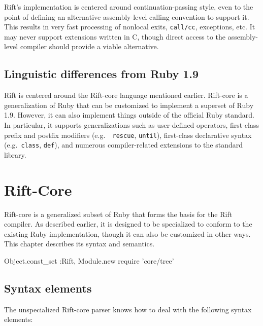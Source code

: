 \documentclass{report}
\begin{document}
    Rift's implementation is centered around continuation-passing style, even to the point of defining an alternative assembly-level calling convention to support it. This results in very fast
    processing of nonlocal exits, {\tt call/cc}, exceptions, etc. It may never support extensions written in C, though direct access to the assembly-level compiler should provide a viable
    alternative.

\section{Linguistic differences from Ruby 1.9}
    Rift is centered around the Rift-core language mentioned earlier. Rift-core is a generalization of Ruby that can be customized to implement a superset of Ruby 1.9. However, it can also
    implement things outside of the official Ruby standard. In particular, it supports generalizations such as user-defined operators, first-class prefix and postfix modifiers (e.g.~{\tt
    rescue}, {\tt until}), first-class declarative syntax (e.g.~{\tt class}, {\tt def}), and numerous compiler-related extensions to the standard library.

\chapter{Rift-Core}
  Rift-core is a generalized subset of Ruby that forms the basis for the Rift compiler. As described earlier, it is designed to be specialized to conform to the existing Ruby implementation,
  though it can also be customized in other ways. This chapter describes its syntax and semantics.

\begin{rubycode}
Object.const_set :Rift, Module.new
require 'core/tree' \end{rubycode}

\section{Syntax elements}
    The unspecialized Rift-core parser knows how to deal with the following syntax elements:
\end{document}
